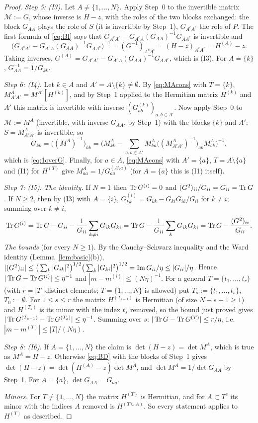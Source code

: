 \begin{proof}
\emph{Step 5: \textup{(I3)}.} Let $A\ne\{1,\dots,N\}$. Apply Step~0 to the invertible matrix $\mathcal M:=G$, whose inverse is $H-z$, with the roles of the two blocks exchanged:
the block $G_{AA}$ plays the role of $S$ (it is invertible by Step~1), $G_{A^cA^c}$ the role of $P$. The first formula of \eqref{eq:BI} says that $G_{A^cA^c}-G_{A^cA}(G_{AA})^{-1}G_{AA^c}$ is invertible and
\[
 \big(G_{A^cA^c}-G_{A^cA}(G_{AA})^{-1}G_{AA^c}\big)^{-1}=(G^{-1})_{A^cA^c}=(H-z)_{A^cA^c}=H^{(A)}-z .
\]
Taking inverses, $G^{(A)}=G_{A^cA^c}-G_{A^cA}(G_{AA})^{-1}G_{AA^c}$, which is (I3). For $A=\{k\}$, $G_{AA}^{-1}=1/G_{kk}$.

\emph{Step 6: \textup{(I4)}.} Let $k\in A$ and $A'=A\setminus\{k\}\ne\emptyset$. By \eqref{eq:MAcons} with $T=\{k\}$, $M^A_{A'A'}=M^{A'}[H^{(k)}]$, and by Step~1 applied to the Hermitian matrix $H^{(k)}$ and $A'$ this matrix
is invertible with inverse $(G^{(k)}_{ab})_{a,b\in A'}$. Now apply Step~0 to $\mathcal M:=M^A$ (invertible, with inverse $G_{AA}$, by Step~1) with the blocks $\{k\}$ and $A'$: $S=M^A_{A'A'}$ is invertible, so
\[
 G_{kk}=\big((M^A)^{-1}\big)_{kk}=\Big(M^A_{kk}-\sum_{a,b\in A'}M^A_{ka}\big((M^A_{A'A'})^{-1}\big)_{ab}M^A_{bk}\Big)^{-1},
\]
which is \eqref{eq:1overG}. Finally, for $a\in A$, \eqref{eq:MAcons} with $A'=\{a\}$, $T=A\setminus\{a\}$ and (I1) for $H^{(T)}$ give $M^A_{aa}=1/G^{(A\setminus a)}_{aa}$ (for $A=\{a\}$ this is (I1) itself).

\emph{Step 7: \textup{(I5)}.} \emph{The identity.} If $N=1$ then $\operatorname{Tr} G^{(i)}=0$ and $(G^2)_{ii}/G_{ii}=G_{ii}=\operatorname{Tr} G$. If $N\ge2$, then by (I3) with $A=\{i\}$, $G^{(i)}_{kk}=G_{kk}-G_{ki}G_{ik}/G_{ii}$ for $k\ne i$; summing over $k\ne i$,
\[
 \operatorname{Tr} G^{(i)}=\operatorname{Tr} G-G_{ii}-\frac1{G_{ii}}\sum_{k\ne i}G_{ik}G_{ki}=\operatorname{Tr} G-\frac1{G_{ii}}\sum_{k}G_{ik}G_{ki}=\operatorname{Tr} G-\frac{(G^2)_{ii}}{G_{ii}} .
\]
\emph{The bounds} (for every $N\ge1$). By the Cauchy--Schwarz inequality and the Ward identity (Lemma~\ref{lem:basic}(b)),
$|(G^2)_{ii}|\le\big(\sum_k|G_{ik}|^2\big)^{1/2}\big(\sum_k|G_{ki}|^2\big)^{1/2}=\operatorname{Im} G_{ii}/\eta\le|G_{ii}|/\eta$. Hence $|\operatorname{Tr} G-\operatorname{Tr} G^{(i)}|\le\eta^{-1}$ and $|m-m^{(i)}|\le(N\eta)^{-1}$.
For a general $T=\{t_1,\dots,t_r\}$ (with $r=|T|$ distinct elements; $T=\{1,\dots,N\}$ is allowed) put $T_s:=\{t_1,\dots,t_s\}$, $T_0:=\emptyset$. For $1\le s\le r$ the matrix $H^{(T_{s-1})}$ is Hermitian (of size $N-s+1\ge1$) and $H^{(T_s)}$ is its minor with the index $t_s$ removed, so the bound just proved gives
$|\operatorname{Tr} G^{(T_{s-1})}-\operatorname{Tr} G^{(T_s)}|\le\eta^{-1}$. Summing over $s$: $|\operatorname{Tr} G-\operatorname{Tr} G^{(T)}|\le r/\eta$, i.e.\ $|m-m^{(T)}|\le|T|/(N\eta)$.

\emph{Step 8: \textup{(I6)}.} If $A=\{1,\dots,N\}$ the claim is $\det(H-z)=\det M^A$, which is true as $M^A=H-z$. Otherwise \eqref{eq:BD} with the blocks of Step~1 gives
$\det(H-z)=\det(H^{(A)}-z)\det M^A$, and $\det M^A=1/\det G_{AA}$ by Step~1. For $A=\{a\}$, $\det G_{AA}=G_{aa}$.

\emph{Minors.} For $T\ne\{1,\dots,N\}$ the matrix $H^{(T)}$ is Hermitian, and for $A\subset T^c$ its minor with the indices $A$ removed is $H^{(T\cup A)}$. So every statement applies to $H^{(T)}$ as described.
\end{proof}

